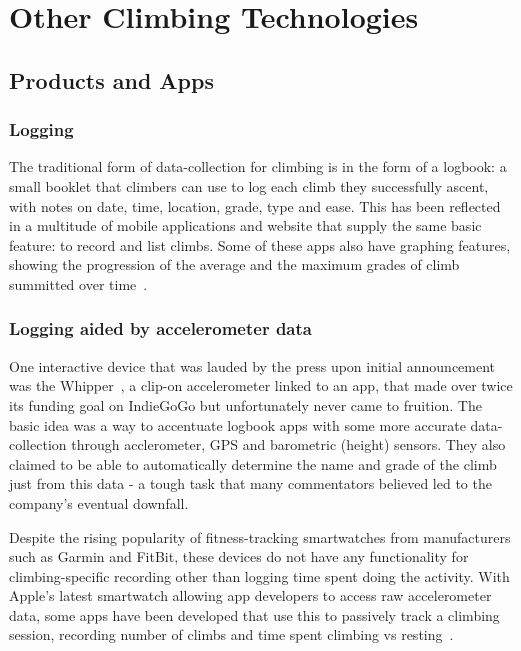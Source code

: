 \section{Other Climbing Technologies}
\subsection{Products and Apps}
\subsubsection{Logging}
The traditional form of data-collection for climbing is in the form of a logbook: a small booklet that climbers can use to log each climb they successfully ascent, with notes on date, time, location, grade, type and ease.
This has been reflected in a multitude of mobile applications and website that supply the same basic feature: to record and list climbs.
Some of these apps also have graphing features, showing the progression of the average and the maximum grades of climb summitted over time~\cite{verticallife}.

\subsubsection{Logging aided by accelerometer data}
One interactive device that was lauded by the press upon initial announcement was the Whipper~\cite{whipper}, a clip-on accelerometer linked to an app, that made over twice its funding goal on IndieGoGo but unfortunately never came to fruition.
The basic idea was a way to accentuate logbook apps with some more accurate data-collection through acclerometer, GPS and barometric (height) sensors.
They also claimed to be able to automatically determine the name and grade of the climb just from this data - a tough task that many commentators believed led to the company's eventual downfall.

Despite the rising popularity of fitness-tracking smartwatches from manufacturers such as Garmin and FitBit, these devices do not have any functionality for climbing-specific recording other than logging time spent doing the activity.
With Apple's latest smartwatch allowing app developers to access raw accelerometer data, some apps have been developed that use this to passively track a climbing session, recording number of climbs and time spent climbing vs resting~\cite{chalkprint}.

